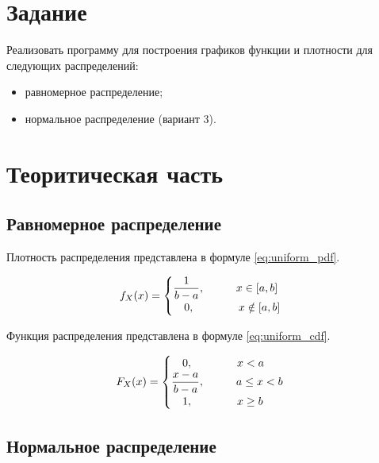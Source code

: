 \section{Задание}

Реализовать программу для построения графиков функции и плотности для следующих распределений:
\begin{itemize}
  \item равномерное распределение;
  \item нормальное распределение (вариант 3).
\end{itemize}


\section{Теоритическая часть}
\subsection{Равномерное распределение}

Плотность распределения представлена в формуле \ref{eq:uniform_pdf}.

\begin{equation}\label{eq:uniform_pdf}
  f_X(x) =
  \begin{cases}
    \dfrac{1}{b-a},  \hspace*{1cm} x \in [a,b] \\
    \quad 0,         \hspace*{1.4cm} x \notin [a, b] \\
  \end{cases}
\end{equation}

Функция распределения представлена в формуле \ref{eq:uniform_cdf}.

\begin{equation}\label{eq:uniform_cdf}
  F_X(x) =
  \begin{cases}
    \quad 0,         \hspace*{1.4cm} x < a \\
    \dfrac{x-a}{b-a},\hspace*{1cm} a \le x < b \\
    \quad 1,         \hspace*{1.4cm} x \geq b \\
  \end{cases}
\end{equation}

\subsection{Нормальное распределение}

